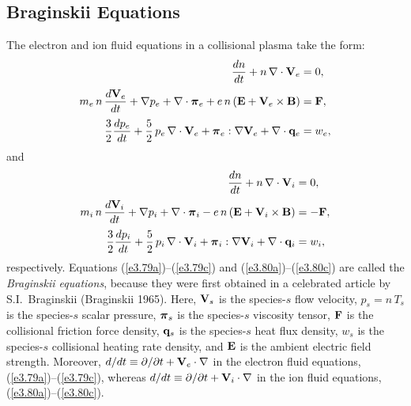 \documentclass[notitlepage,12pt]{article}
\newcommand{\bpi}{\mbox{\boldmath$\pi$}}
\begin{document}
\subsection{Braginskii Equations}
The electron and ion fluid equations in a collisional plasma
take the form:
\begin{align}\label{e3.79a}
\frac{dn}{dt} + n\,\nabla\cdot{\bf V}_e &= 0,\\[0.5ex]
m_e \,n\,\frac{d {\bf V}_e}{dt} + \nabla p_e+ \nabla\cdot \bpi_e + e\, n\,
({\bf E} + {\bf V}_e\times {\bf B})& = {\bf F},\\[0.5ex]
\frac{3}{2}\frac{d p_e}{dt} + \frac{5}{2}\,p_e\,\nabla\cdot{\bf V}_e
+ \bpi_e:\nabla{\bf V}_e+ \nabla\cdot{\bf q}_e &= w_e,\label{e3.79c}
\end{align}
and
\begin{align}\label{e3.80a}
\frac{dn}{dt} + n\,\nabla\cdot{\bf V}_i &= 0,\\[0.5ex]
m_i \,n\,\frac{d {\bf V}_i}{dt} + \nabla p_i + \nabla\cdot \bpi_i - e\, n\,
({\bf E} + {\bf V}_i\times {\bf B})& =- {\bf F},\\[0.5ex]
\frac{3}{2}\frac{d p_i}{dt} + \frac{5}{2}\,p_i\,\nabla\cdot{\bf V}_i
+ \bpi_i:\nabla{\bf V}_i+ \nabla\cdot{\bf q}_i &= w_i,\label{e3.80c}
\end{align}
respectively. 
Equations (\ref{e3.79a})--(\ref{e3.79c}) and (\ref{e3.80a})--(\ref{e3.80c})  are called the {\em Braginskii equations}, because they were first obtained
in a celebrated article by S.I.~Braginskii (Braginskii 1965). Here, ${\bf V}_s$ is the species-$s$ flow velocity, $p_s=n\,T_s$ is the 
species-$s$ scalar
pressure, $\bpi_s$ is the species-$s$ viscosity tensor, ${\bf F}$ is the collisional friction force density, ${\bf q}_s$ is the species-$s$ heat flux density, $w_s$ is the species-$s$ collisional heating rate density, and ${\bf E}$ is the ambient electric field strength. Moreover, $d/dt\equiv \partial/\partial t + {\bf V}_e\cdot\nabla$ in the electron fluid equations, (\ref{e3.79a})--(\ref{e3.79c}), whereas  $d/dt\equiv \partial/\partial t + {\bf V}_i\cdot\nabla$ in the ion fluid equations,  (\ref{e3.80a})--(\ref{e3.80c}). 
\end{document}
